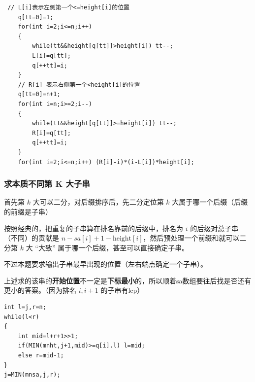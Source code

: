 \begin{verbatim}
 // L[i]表示左侧第一个<=height[i]的位置
    q[tt=0]=1;
    for(int i=2;i<=n;i++)
    {
        while(tt&&height[q[tt]]>height[i]) tt--;
        L[i]=q[tt];
        q[++tt]=i;
    }
    // R[i] 表示右侧第一个<height[i]的位置
    q[tt=0]=n+1;
    for(int i=n;i>=2;i--) 
    {   
        while(tt&&height[q[tt]]>=height[i]) tt--;
        R[i]=q[tt];
        q[++tt]=i;
    }   
    for(int i=2;i<=n;i++) (R[i]-i)*(i-L[i])*height[i];
\end{verbatim}
\subsubsection{求本质不同第 K 大子串}
\par \noindent 首先第 $k$ 大可以二分，对后缀排序后，先二分定位第 $k$ 大属于哪一个后缀（后缀的前缀是子串）
~\\
\par \noindent 按照经典的，把重复的子串算在排名靠前的后缀中，排名为 $i$ 的后缀对总子串（不同）的贡献是 $n-sa[i]+1-\text{height}[i]$，然后预处理一个前缀和就可以二分第 $k$ 大 “大致” 属于哪一个后缀，甚至可以直接确定子串。
~\\
\par \noindent 不过本题要求输出子串最早出现的位置（左右端点确定一个子串）。
~\\
\par \noindent 上述求的该串的\textbf{开始位置}不一定是\textbf{下标最小}的，所以顺着sa数组要往后找是否还有更小的答案。（因为排名 $i,i+1$ 的子串有lcp）
\begin{verbatim}
int l=j,r=n;
while(l<r)
{
    int mid=l+r+1>>1;
    if(MIN(mnht,j+1,mid)>=q[i].l) l=mid;
    else r=mid-1;
}
j=MIN(mnsa,j,r);
\end{verbatim}
